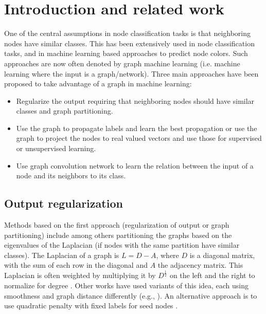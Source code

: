 \section{Introduction and related work}
One of the central assumptions in node classification tasks is that neighboring nodes have similar classes. This has been extensively used in node classification tasks, and in machine learning based approaches to predict node colors. Such approaches are now often denoted by graph machine learning (i.e. machine learning where the input is a graph/network). Three main approaches have been proposed to take advantage of a graph in machine learning:
\begin{itemize}
\item   Regularize the output requiring that neighboring nodes should have similar classes and graph partitioning.
\item   Use the graph to propagate labels and learn the best propagation or use the graph to project the nodes to real valued vectors and use those for supervised or unsupervised learning.
\item   Use graph convolution network to learn the relation between the input of a node and its neighbors to its class.
\end{itemize}

\subsection*{Output regularization}
Methods based on the first approach (regularization of output or graph partitioning) include among others partitioning the graphs based on the eigenvalues of the Laplacian (if nodes with the same partition have similar classes). The Laplacian of a graph is $L = D-A$, where $D$ is a diagonal matrix, with the sum of each row in the diagonal and $A$ the adjacency matrix. This Laplacian is often weighted by multiplying it by $D^\frac{1}{2}$ on the left and the right to normalize for degree \cite{dhillon2007weighted}\cite{karypis1995metis}.  Other works have used variants of this idea, each using smoothness and graph distance differently (e.g., \cite{belkin2004semi}\cite{sindhwani2005beyond}). An alternative approach is to use quadratic penalty with fixed labels for seed nodes \cite{zhou2004learning}\cite{zhu2003semi}.

